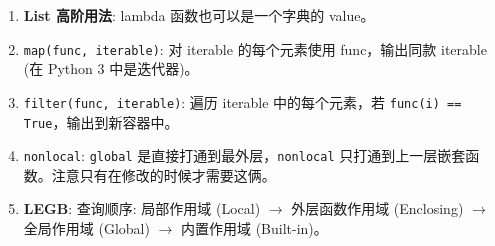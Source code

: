 \documentclass[a4paper, 12pt]{article}
\newcommand{\code}[1]{\texttt{\color{blue!60!black}#1}}
\newcommand{\kw}[1]{\textbf{#1}} %
\newcommand{\threedigits}[1]{%
  \ifnum#1<10 00#1%
  \else\ifnum#1<100 0#1%
  \else #1%
  \fi\fi%
}
\begin{document}
\begin{enumerate}[label=\textbf{\protect\threedigits{\value*}.}, leftmargin=3.5em, itemsep=0.8ex, parsep=0.5ex]
    \item \kw{List 高阶用法}: lambda 函数也可以是一个字典的 value。
    
    \item \code{map(func, iterable)}: 对 iterable 的每个元素使用 func，输出同款 iterable (在 Python 3 中是迭代器)。
    
    \item \code{filter(func, iterable)}: 遍历 iterable 中的每个元素，若 \code{func(i) == True}，输出到新容器中。
    
    \item \code{nonlocal}: \code{global} 是直接打通到最外层，\code{nonlocal} 只打通到上一层嵌套函数。注意只有在修改的时候才需要这俩。
    
    \item \kw{LEGB}: 查询顺序: 局部作用域 (Local) $\to$ 外层函数作用域 (Enclosing) $\to$ 全局作用域 (Global) $\to$ 内置作用域 (Built-in)。

\end{enumerate}
\end{document}
